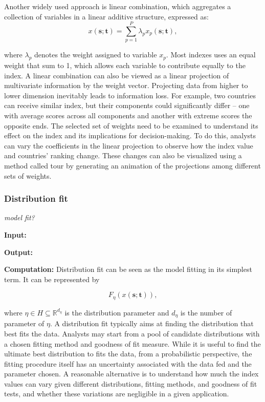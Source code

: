 \documentclass[
]{interact}
\begin{document}
Another widely used approach is linear combination, which aggregates a
collection of variables in a linear additive structure, expressed as:
\[x(\mathbf{s}; \mathbf{t}) = \sum_{p = 1}^{P}\lambda_{p}x_p(\mathbf{s};\mathbf{t}),\]

where \(\lambda_p\) denotes the weight assigned to variable \(x_p\).
Most indexes uses an equal weight that sum to 1, which allows each
variable to contribute equally to the index. A linear combination can
also be viewed as a linear projection of multivariate information by the
weight vector. Projecting data from higher to lower dimension inevitably
leads to information loss. For example, two countries can receive
similar index, but their components could significantly differ -- one
with average scores across all components and another with extreme
scores the opposite ends. The selected set of weights need to be
examined to understand its effect on the index and its implications for
decision-making. To do this, analysts can vary the coefficients in the
linear projection to observe how the index value and countries' ranking
change. These changes can also be visualized using a method called tour
by generating an animation of the projections among different sets of
weights.

\hypertarget{distribution-fit}{%
\subsubsection{Distribution fit}\label{distribution-fit}}

\emph{model fit? }

\textbf{Input: }

\textbf{Output: }

\textbf{Computation:} Distribution fit can be seen as the model fitting
in its simplest term. It can be represented by

\begin{equation}
F_{\eta}(x(\mathbf{s}; \mathbf{t})), 
\end{equation}

where \(\eta \in H \subseteq \mathbb{R}^{d_{\eta}}\) is the distribution
parameter and \(d_{\eta}\) is the number of parameter of \(\eta\). A
distribution fit typically aims at finding the distribution that best
fits the data. Analysts may start from a pool of candidate distributions
with a chosen fitting method and goodness of fit measure. While it is
useful to find the ultimate best distribution to fits the data, from a
probabilistic perspective, the fitting procedure itself has an
uncertainty associated with the data fed and the parameter chosen. A
reasonable alternative is to understand how much the index values can
vary given different distributions, fitting methods, and goodness of fit
tests, and whether these variations are negligible in a given
application.
\end{document}
